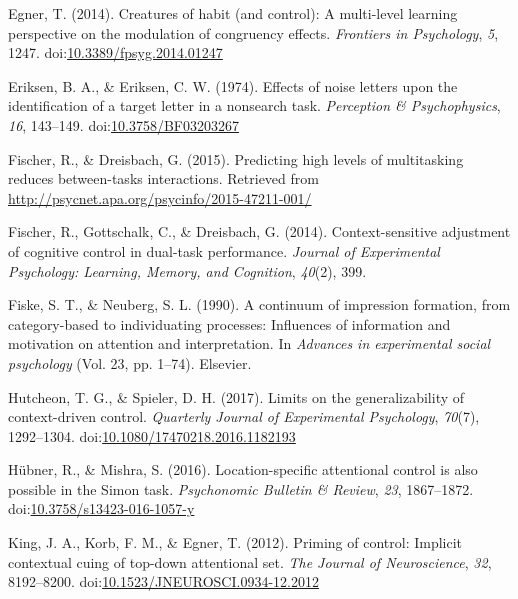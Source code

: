 \documentclass[english,,man,floatsintext]{apa6}
\begin{document}
\leavevmode\hypertarget{ref-egner_creatures_2014}{}%
Egner, T. (2014). Creatures of habit (and control): A multi-level learning perspective on the modulation of congruency effects. \emph{Frontiers in Psychology}, \emph{5}, 1247. doi:\href{https://doi.org/10.3389/fpsyg.2014.01247}{10.3389/fpsyg.2014.01247}

\leavevmode\hypertarget{ref-eriksen_effects_1974}{}%
Eriksen, B. A., \& Eriksen, C. W. (1974). Effects of noise letters upon the identification of a target letter in a nonsearch task. \emph{Perception \& Psychophysics}, \emph{16}, 143--149. doi:\href{https://doi.org/10.3758/BF03203267}{10.3758/BF03203267}

\leavevmode\hypertarget{ref-fischer_predicting_2015}{}%
Fischer, R., \& Dreisbach, G. (2015). Predicting high levels of multitasking reduces between-tasks interactions. Retrieved from \url{http://psycnet.apa.org/psycinfo/2015-47211-001/}

\leavevmode\hypertarget{ref-fischer_context-sensitive_2014}{}%
Fischer, R., Gottschalk, C., \& Dreisbach, G. (2014). Context-sensitive adjustment of cognitive control in dual-task performance. \emph{Journal of Experimental Psychology: Learning, Memory, and Cognition}, \emph{40}(2), 399.

\leavevmode\hypertarget{ref-fiske_continuum_1990}{}%
Fiske, S. T., \& Neuberg, S. L. (1990). A continuum of impression formation, from category-based to individuating processes: Influences of information and motivation on attention and interpretation. In \emph{Advances in experimental social psychology} (Vol. 23, pp. 1--74). Elsevier.

\leavevmode\hypertarget{ref-hutcheon_limits_2017}{}%
Hutcheon, T. G., \& Spieler, D. H. (2017). Limits on the generalizability of context-driven control. \emph{Quarterly Journal of Experimental Psychology}, \emph{70}(7), 1292--1304. doi:\href{https://doi.org/10.1080/17470218.2016.1182193}{10.1080/17470218.2016.1182193}

\leavevmode\hypertarget{ref-hubner_location-specific_2016}{}%
Hübner, R., \& Mishra, S. (2016). Location-specific attentional control is also possible in the Simon task. \emph{Psychonomic Bulletin \& Review}, \emph{23}, 1867--1872. doi:\href{https://doi.org/10.3758/s13423-016-1057-y}{10.3758/s13423-016-1057-y}

\leavevmode\hypertarget{ref-king_priming_2012}{}%
King, J. A., Korb, F. M., \& Egner, T. (2012). Priming of control: Implicit contextual cuing of top-down attentional set. \emph{The Journal of Neuroscience}, \emph{32}, 8192--8200. doi:\href{https://doi.org/10.1523/JNEUROSCI.0934-12.2012}{10.1523/JNEUROSCI.0934-12.2012}
\end{document}
